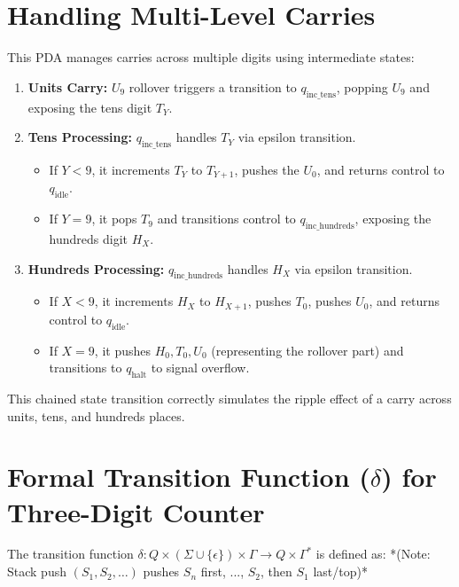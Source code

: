 \documentclass[11pt]{article}
\begin{document}
\section{Handling Multi-Level Carries} \label{sec:carry_handling_3digit}

This PDA manages carries across multiple digits using intermediate states:
\begin{enumerate}
    \item \textbf{Units Carry:} $U_9$ rollover triggers a transition to $q_{\text{inc\_tens}}$, popping $U_9$ and exposing the tens digit $T_Y$.
    \item \textbf{Tens Processing:} $q_{\text{inc\_tens}}$ handles $T_Y$ via epsilon transition.
        \begin{itemize}
            \item If $Y < 9$, it increments $T_Y$ to $T_{Y+1}$, pushes the $U_0$, and returns control to $q_{\text{idle}}$.
            \item If $Y = 9$, it pops $T_9$ and transitions control to $q_{\text{inc\_hundreds}}$, exposing the hundreds digit $H_X$.
        \end{itemize}
    \item \textbf{Hundreds Processing:} $q_{\text{inc\_hundreds}}$ handles $H_X$ via epsilon transition.
        \begin{itemize}
            \item If $X < 9$, it increments $H_X$ to $H_{X+1}$, pushes $T_0$, pushes $U_0$, and returns control to $q_{\text{idle}}$.
            \item If $X = 9$, it pushes $H_0, T_0, U_0$ (representing the rollover part) and transitions to $q_{\text{halt}}$ to signal overflow.
        \end{itemize}
\end{enumerate}
This chained state transition correctly simulates the ripple effect of a carry across units, tens, and hundreds places.

\section{Formal Transition Function ($\delta$) for Three-Digit Counter} \label{sec:formaltransition3digit}

The transition function $\delta: Q \times (\Sigma \cup \{\epsilon\}) \times \Gamma \rightarrow Q \times \Gamma^*$ is defined as:
*(Note: Stack push $(S_1, S_2, \dots)$ pushes $S_n$ first, ..., $S_2$, then $S_1$ last/top)*
\end{document}
